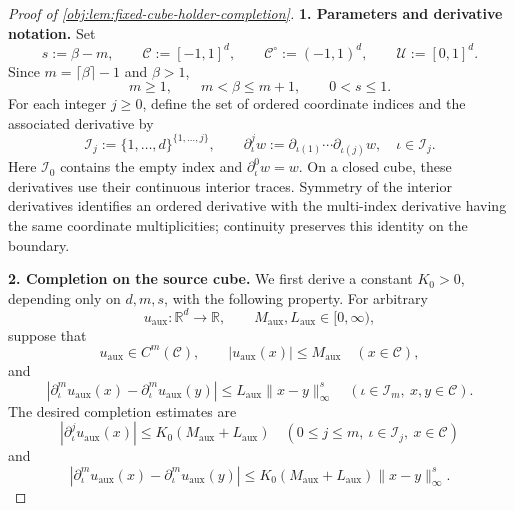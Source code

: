 \begin{proof}[Proof of \cref{obj:lem:fixed-cube-holder-completion}]
\textbf{1. Parameters and derivative notation.}
Set
\[
s:=\beta-m,\qquad
\mathscr C:=[-1,1]^d,\qquad
\mathscr C^\circ:=(-1,1)^d,\qquad
\mathscr U:=[0,1]^d.
\]
Since \(m=\lceil\beta\rceil-1\) and \(\beta>1\),
\[
m\ge1,\qquad
m<\beta\le m+1,\qquad
0<s\le1.
\]
For each integer \(j\ge0\), define the set of ordered coordinate indices and the associated derivative by
\[
\mathscr I_j:=\{1,\ldots,d\}^{\{1,\ldots,j\}},
\qquad
\partial_\iota^j w
:=
\partial_{\iota(1)}\cdots\partial_{\iota(j)}w,
\quad \iota\in\mathscr I_j.
\]
Here \(\mathscr I_0\) contains the empty index and
\(\partial_\iota^0w=w\). On a closed cube, these derivatives use their continuous interior traces. Symmetry of the interior derivatives identifies an ordered derivative with the multi-index derivative having the same coordinate multiplicities; continuity preserves this identity on the boundary.

\textbf{2. Completion on the source cube.}
We first derive a constant \(K_0>0\), depending only on \(d,m,s\), with the following property. For arbitrary
\[
u_{\mathrm{aux}}:\mathbb R^d\to\mathbb R,
\qquad
M_{\mathrm{aux}},L_{\mathrm{aux}}\in[0,\infty),
\]
suppose that
\[
u_{\mathrm{aux}}\in C^m(\mathscr C),\qquad
|u_{\mathrm{aux}}(x)|\le M_{\mathrm{aux}}
\quad(x\in\mathscr C),
\]
and
\[
|\partial_\iota^m u_{\mathrm{aux}}(x)
-\partial_\iota^m u_{\mathrm{aux}}(y)|
\le L_{\mathrm{aux}}\|x-y\|_\infty^s
\quad(\iota\in\mathscr I_m,\ x,y\in\mathscr C).
\]
The desired completion estimates are
\[
|\partial_\iota^j u_{\mathrm{aux}}(x)|
\le K_0(M_{\mathrm{aux}}+L_{\mathrm{aux}})
\quad(0\le j\le m,\ \iota\in\mathscr I_j,\ x\in\mathscr C)
\]
and
\[
|\partial_\iota^m u_{\mathrm{aux}}(x)
-\partial_\iota^m u_{\mathrm{aux}}(y)|
\le K_0(M_{\mathrm{aux}}+L_{\mathrm{aux}})
\|x-y\|_\infty^s.
\]


\end{proof}
